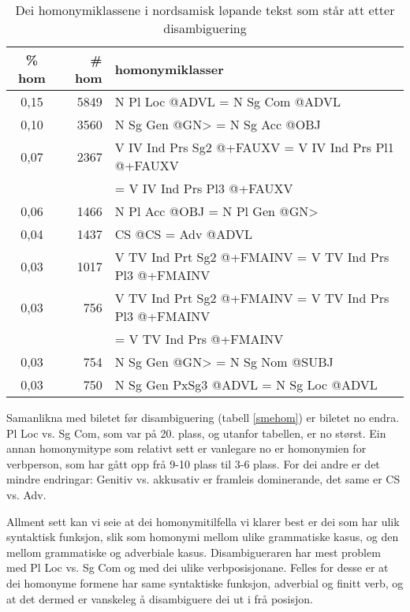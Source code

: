 \documentclass[a4paper,norsk]{article}
\begin{document}
\begin{table}[htdp]
\caption{Dei homonymiklassene i nordsamisk løpande tekst som står att etter disambiguering}
\begin{center}
\begin{tabular}{|c|r|l|}
\hline
\% hom & \# hom & homonymiklasser \\
\hline
0,15 & 5849 & N Pl Loc @ADVL = N Sg Com @ADVL \\ 
0,10 & 3560 & N Sg Gen @GN> = N Sg Acc @OBJ \\ 
0,07 & 2367 & V IV Ind Prs Sg2 @+FAUXV = V IV Ind Prs Pl1 @+FAUXV \\
     &      &  = V IV Ind Prs Pl3 @+FAUXV \\ 
0,06 & 1466 & N Pl Acc @OBJ = N Pl Gen @GN> \\ 
0,04 & 1437 & CS @CS = Adv @ADVL \\ 
0,03 & 1017 & V TV Ind Prt Sg2 @+FMAINV = V TV Ind Prs Pl3 @+FMAINV \\ 
0,03 & 756 & V TV Ind Prt Sg2 @+FMAINV = V TV Ind Prs Pl3 @+FMAINV \\
     &     &  = V TV Ind Prs @+FMAINV \\ 
0,03 & 754 & N Sg Gen @GN> = N Sg Nom @SUBJ \\ 
0,03 & 750 & N Sg Gen PxSg3 @ADVL = N Sg Loc @ADVL \\ 
\hline
\end{tabular}
\end{center}
\label{smedishom}
\end{table}%


Samanlikna med biletet før disambiguering (tabell \ref{smehom}) er biletet no endra. Pl Loc vs. Sg Com, som var på 20. plass, og utanfor tabellen, er no størst. Ein annan homonymitype som relativt sett er vanlegare no er homonymien for verbperson, som har gått opp frå 9-10 plass til 3-6 plass. For dei andre er det mindre endringar: Genitiv vs. akkusativ er framleis dominerande, det same er CS vs. Adv.

Allment sett kan vi seie at dei homonymitilfella vi klarer best er dei som har ulik syntaktisk funksjon, slik som homonymi mellom ulike grammatiske kasus, og den mellom grammatiske og adverbiale kasus. Disambigueraren har mest problem med Pl Loc vs. Sg Com og med dei ulike verbposisjonane. Felles for desse er at dei homonyme formene har same syntaktiske funksjon, adverbial og finitt verb, og at det dermed er vanskeleg å disambiguere dei ut i frå posisjon.
\end{document}
